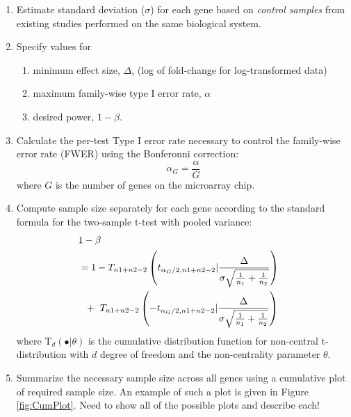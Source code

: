 \documentclass{bioinfo}
\begin{document}
\begin{enumerate}
\item{Estimate standard deviation ($\sigma$) for each gene based on
    \emph{control samples} from existing studies performed on the
    same biological system.}

\item{Specify values for
    \begin{enumerate}
    \item minimum effect size, $\Delta$, (log of fold-change for log-transformed data)
    \item maximum family-wise type I error rate, $\alpha$
    \item desired power, $1 - \beta$.
    \end{enumerate}
  }

\item{Calculate the per-test Type I error rate necessary to control
    the family-wise error rate (FWER) using the Bonferonni correction:}
\begin{equation}
  \alpha_G = \frac{\alpha}{G}
\end{equation}
%
where $G$ is the number of genes on the microarray chip.

\item{Compute sample size separately for each gene according to the
    standard formula for the two-sample t-test with pooled variance:}
  \begin{eqnarray}
    \lefteqn{1-\beta} \nonumber \\
    &= 1-T_{n1+n2-2} \left( t_{\alpha_G/2,n1+n2-2} | \frac{\Delta}{\sigma \sqrt{\frac{1}{n_1} + \frac{1}{n_2}}}\right) \nonumber \\
    &  ~~+~T_{n1+n2-2} \left( -t_{\alpha_G/2,n1+n2-2} | \frac{\Delta}{\sigma \sqrt{\frac{1}{n_1} + \frac{1}{n_2}}}\right)
    \label{eq:formula}
  \end{eqnarray}
  where $\mathrm{T}_{d}(\bullet|\theta)$ is the cumulative
  distribution function for non-central t-distribution with $d$ degree
  of freedom and the non-centrality parameter $\theta$.

\item{Summarize the necessary sample size across all genes using a
    cumulative plot of required sample size. An example of such a
    plot is given in Figure \ref{fig:CumPlot}.  {\Huge Need to show
    all of the possible plots and describe each!} }

\end{enumerate}
\end{document}
